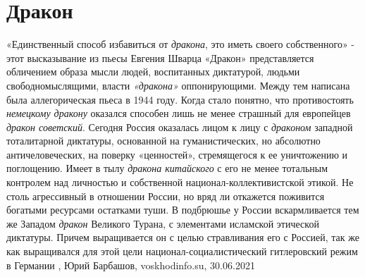  
 
 
 
 
\chapter{Дракон}

«Единственный способ избавиться от \emph{дракона}, это иметь своего собственного» -
этот высказывание из пьесы Евгения Шварца «Дракон» представляется обличением
образа мысли людей, воспитанных диктатурой, людьми свободномыслящими, власти
\emph{«дракона»} оппонирующими. Между тем написана была аллегорическая пьеса в 1944
году. Когда стало понятно, что противостоять \emph{немецкому дракону} оказался
способен лишь не менее страшный для европейцев \emph{дракон советский}.  Сегодня
Россия оказалась лицом к лицу с \emph{драконом} западной тоталитарной диктатуры,
основанной на гуманистических, но абсолютно античеловеческих, на поверку
«ценностей», стремящегося к ее уничтожению и поглощению. Имеет в тылу \emph{дракона
китайского} с его не менее тотальным контролем над личностью и собственной
национал-коллективистской этикой. Не столь агрессивный в отношении России, но
вряд ли откажется поживится богатыми ресурсами остатками туши. В подбрюшье у
России вскармливается тем же Западом \emph{дракон} Великого Турана, с элементами
исламской этической диктатуры. Причем выращивается он с целью стравливания его
с Россией, так же как выращивался для этой цели национал-социалистический
гитлеровский режим в Германии
, 
Юрий Барбашов, voskhodinfo.su, 30.06.2021

